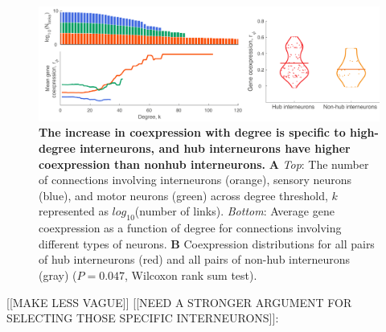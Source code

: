 \documentclass[10pt,letterpaper]{article}
\begin{document}
\begin{figure}[h]
\centering
   \includegraphics[width=1\textwidth]{DegreeTypeALL.pdf}
 \caption{
\textbf{The increase in coexpression with degree is specific to high-degree interneurons, and hub interneurons have higher coexpression than nonhub interneurons.}
\textbf{A} \emph{Top}: The number of connections involving interneurons (orange), sensory neurons (blue), and motor neurons (green) across degree threshold, $k$ represented as $log_{10}$(number of links).
\emph{Bottom}: Average gene coexpression as a function of degree for connections involving different types of neurons.
\textbf{B} Coexpression distributions for all pairs of hub interneurons (red) and all pairs of non-hub interneurons (gray) ($P = 0.047$, Wilcoxon rank sum test).
}
 \label{fig:interneuron_dep}
\end{figure}

[[MAKE LESS VAGUE]] [[NEED A STRONGER ARGUMENT FOR SELECTING THOSE SPECIFIC INTERNEURONS]]:\\
\end{document}
